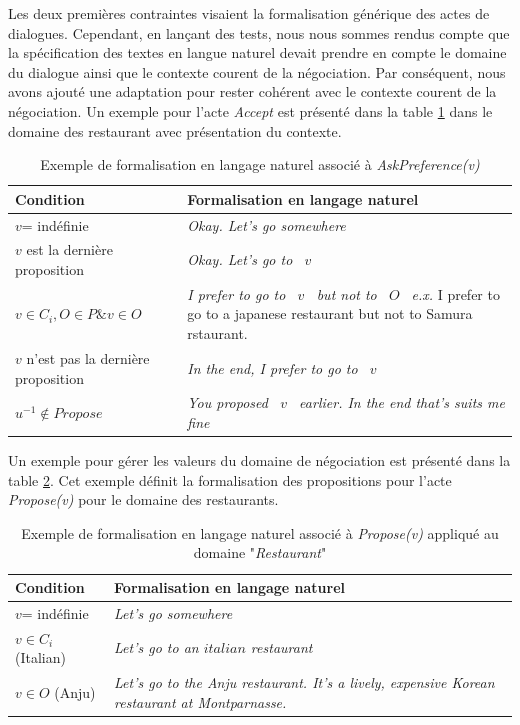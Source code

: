 			Les deux premières contraintes visaient la formalisation générique des actes de dialogues. Cependant, en lançant des tests, nous nous sommes rendus compte que la spécification des textes en langue naturel devait prendre en compte le domaine du dialogue ainsi que le contexte courent de la négociation. 
			Par conséquent, nous avons ajouté une adaptation pour rester cohérent avec le contexte courent de la négociation. Un exemple pour l'acte \emph{Accept} est présenté dans la table \ref{tab:AcceptEx} dans le domaine des restaurant avec présentation du contexte.
			
			\begin{table} [h]
				\centering
				\begin{tabular} {p{4cm}| p{6.5cm}}
					\hline
					\hline
					Condition & Formalisation en langage naturel \\
					\hline
					$v$= indéfinie & \textit{Okay. Let's go somewhere} \\
					\hline
					$ v $ est la dernière proposition  & \textit{Okay. Let's go to \ $v$ \ } \\
					\hline
					 $ v \in C_i,  O \in P  \& v \in O$ & \textit{I prefer to go to \ $v$ \, but not to \ $O$\ }
															\newline \emph{e.x.} I prefer to go to a japanese restaurant but not to Samura rstaurant. \\
					\hline
					$ v $ n'est pas la dernière proposition & \textit{In the end, I prefer to go to  \ $v$ \ } \\
					\hline
					$u^{-1} \not \in Propose$ & \textit{You proposed  \ $v$ \ earlier. In the end that's suits me fine} \\
					\hline
					\hline
				\end{tabular}
				\caption{\label{tab:AcceptEx} Exemple de formalisation en langage naturel associé à \emph{AskPreference(v)}}
			\end{table}
			
			Un exemple pour gérer les valeurs du domaine de négociation est présenté dans la table \ref{tab:ProposeEx}. Cet exemple définit la formalisation des propositions pour l'acte \emph{Propose(v)} pour le domaine des restaurants.
					\begin{table} [h]
						\centering
						\begin{tabular} {p{3.5cm} p{7cm}}
							\hline
							\hline
							Condition & Formalisation en langage naturel \\
							\hline
							$v$= indéfinie & \textit{Let's go somewhere } \\
							\hline
							$ v \in C_i$ (Italian)  & \textit{Let's go to an $italian$ restaurant} \\
							\hline
							$v \in O$ (Anju) & \textit{Let's go to the Anju restaurant. It's a lively, expensive Korean restaurant at Montparnasse.}\\
							\hline
							\hline
						\end{tabular}
						\caption{\label{tab:ProposeEx} Exemple de formalisation en langage naturel associé à \emph{Propose(v)} appliqué au domaine "\textit{Restaurant}"}
					\end{table}
	
